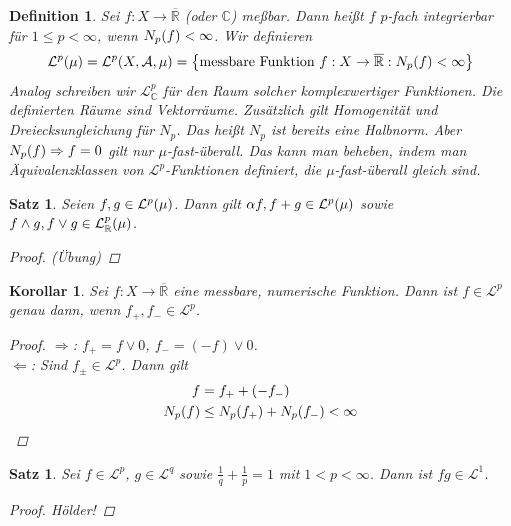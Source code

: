 \documentclass[11pt, twoside, a4paper]{article}
\theoremstyle{plain}
\newtheorem{definition}[blockelement]{Definition}
\newtheorem{satz}[blockelement]{Satz}
\newtheorem{korollar}[blockelement]{Korollar}
\numberwithin{equation}{subsection}
\newcommand{\set}[1]{\left\{#1\right\}}
\newcommand{\pair}[1]{\left(#1\right)}
\newcommand{\of}[1]{\mathopen{}\mathclose{}\bgroup\left(#1\aftergroup\egroup\right)}
\newcommand{\impl}[0]{\Rightarrow{}}
\newcommand{\anf}[1]{\glqq{}#1\grqq}
\newcommand{\R}{\mathbb{R}}
\newcommand{\C}{\mathbb{C}}
\newcommand{\mA}{\mathcal{A}}
\newcommand{\mL}{\mathcal{L}}
\begin{document}
    \begin{definition}
        Sei $f: X \to\overline{\R}$ (oder $\C$) meßbar. Dann heißt $f$ $p$-fach integrierbar für $1\leq p < \infty$, wenn $N_p\of{f} < \infty$. Wir definieren
        \begin{align*}
            \mL^p\of{\mu} = \mL^p\of{X, \mA, \mu} = \set{\text{messbare Funktion }f: X \to\overline{\R}: N_p\of{f}<\infty}
        \end{align*}
        Analog schreiben wir $\mL_{\C}^p$ für den Raum solcher komplexwertiger Funktionen. Die definierten Räume sind Vektorräume. Zusätzlich gilt Homogenität und Dreiecksungleichung für $N_p$. Das heißt $N_p$ ist bereits eine Halbnorm. Aber $N_p\of{f} \impl f = 0$ gilt nur $\mu$-fast-überall. Das kann man beheben, indem man Äquivalenzklassen von $\mL^p$-Funktionen definiert, die $\mu$-fast-überall gleich sind.
    \end{definition}

    \begin{satz} %
        Seien $f, g\in \mL^p\of{\mu}$. Dann gilt $\alpha f, f+g\in\mL^p\of{\mu}$ sowie $f\land g, f\lor g \in\mL_{\R}^p\of{\mu}$.

        \begin{proof}
        (Übung)
        \end{proof}
    \end{satz}

    \begin{korollar} %
        Sei $f: X \to\overline{\R}$ eine messbare, numerische Funktion. Dann ist $f\in\mL^p$ genau dann, wenn $f_+, f_- \in\mL^p$.

        \begin{proof}
            \anf{$\impl$}: $f_+ = f \lor 0$, $f_- = (-f) \lor 0$.\\
            \anf{$\Leftarrow$}: Sind $f_{\pm}\in\mL^p$. Dann gilt
            \begin{align*}
                f &= f_+ + \pair{-f_-}\\
                N_p\of{f} &\leq N_p\of{f_+} + N_p\of{f_-} < \infty\qedhere
            \end{align*}
        \end{proof}
    \end{korollar}

    \begin{satz}
        Sei $f\in\mL^p$, $g\in\mL^q$ sowie $\frac{1}{q}+\frac{1}{p} = 1$ mit $1 < p < \infty$. Dann ist $fg \in\mL^1$.
        \begin{proof}
            Hölder!
        \end{proof}
    \end{satz}
\end{document}
